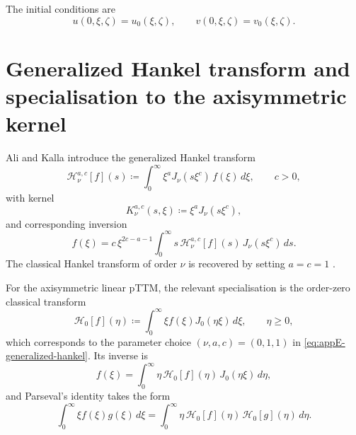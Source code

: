 The initial conditions are
\begin{equation}
    u(0,\xi,\zeta)=u_0(\xi,\zeta),
    \qquad
    v(0,\xi,\zeta)=v_0(\xi,\zeta).
    \label{eq:appE-initial-data}
\end{equation}

\section{Generalized Hankel transform and specialisation to the axisymmetric kernel}
\label{sec:appE-generalized-hankel}

Ali and Kalla \cite{Ali_Kalla_1999} introduce the generalized Hankel transform
\begin{equation}
    \mathscr{H}_{\nu}^{a,c}[f](s)
    \coloneqq
    \int_{0}^{\infty}
    \xi^{a} J_{\nu}(s\xi^{c})\, f(\xi)\, d\xi,
    \qquad c>0,
    \label{eq:appE-generalized-hankel}
\end{equation}
with kernel
\begin{equation}
    K_{\nu}^{a,c}(s,\xi)\coloneqq \xi^{a}J_{\nu}(s\xi^{c}),
    \label{eq:appE-generalized-hankel-kernel}
\end{equation}
and corresponding inversion
\begin{equation}
    f(\xi)
    =
    c\,\xi^{2c-a-1}
    \int_{0}^{\infty}
    s\, \mathscr{H}_{\nu}^{a,c}[f](s)\,
    J_{\nu}(s\xi^{c})\, ds.
    \label{eq:appE-generalized-hankel-inverse}
\end{equation}
The classical Hankel transform of order \(\nu\) is recovered by setting
\(a=c=1\) \cite{Ali_Kalla_1999,Davies_2002_Hankel}.

For the axisymmetric linear pTTM, the relevant specialisation is the
order-zero classical transform
\begin{equation}
    \mathscr{H}_0[f](\eta)
    \coloneqq
    \int_{0}^{\infty}
    \xi f(\xi) J_0(\eta\xi)\, d\xi,
    \qquad \eta\ge 0,
    \label{eq:appE-hankel-order-zero}
\end{equation}
which corresponds to the parameter choice
\((\nu,a,c)=(0,1,1)\) in \eqref{eq:appE-generalized-hankel}.
Its inverse is
\begin{equation}
    f(\xi)
    =
    \int_{0}^{\infty}
    \eta\, \mathscr{H}_0[f](\eta)\, J_0(\eta\xi)\, d\eta,
    \label{eq:appE-hankel-order-zero-inverse}
\end{equation}
and Parseval's identity takes the form
\begin{equation}
    \int_{0}^{\infty}\xi f(\xi)g(\xi)\, d\xi
    =
    \int_{0}^{\infty}\eta\, \mathscr{H}_0[f](\eta)\, \mathscr{H}_0[g](\eta)\, d\eta.
    \label{eq:appE-hankel-parseval}
\end{equation}

